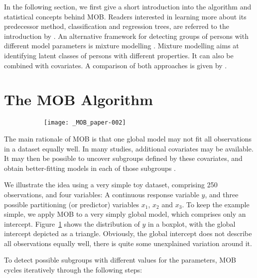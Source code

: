 \documentclass[doc,floatsintext,natbib]{apa7}
\begin{document}
In the following section, we first give a short introduction into the algorithm and statistical concepts behind MOB. Readers interested in learning more about its predecessor method, classification and regression trees, are referred to the introduction by \citet{StrMalTut:2009:PM}. An alternative framework for detecting groups of persons with different model parameters is mixture modelling \citep[see, e.g.,][in the context of Rasch modelling]{AyalySant17,FriStrZei:2015:EaPM}. Mixture modelling aims at identifying latent classes of persons with different properties. It can also be combined with covariates. A comparison of both approaches is given by \citet{FriStrZei:2014}. 


\section{The MOB Algorithm}


\begin{figure}
\caption{Univariate distribution of the response variable, with global mean indicated by triangle.}
\begin{subfigure}{.5\textwidth}
\texttt{[image: \_MOB\_paper-002]}
\end{subfigure}
\label{fig:global}
\end{figure}

The main rationale of MOB is that one global model may not fit all observations in a dataset equally well. In many studies, additional covariates may be available. It may then be possible to uncover subgroups defined by these covariates, and obtain better-fitting models in each of those subgroups \citep{ZeilyHoth08}. 

We illustrate the idea using a very simple toy dataset, comprising 250 observations, and four variables: A continuous response variable $y$, and three possible partitioning (or predictor) variables $x_1$, $x_2$ and $x_3$. To keep the example simple, we apply MOB to a very simply global model, which comprises only an intercept. Figure~\ref{fig:global} shows the distribution of $y$ in a boxplot, with the global intercept depicted as a triangle. Obviously, the global intercept does not describe all observations equally well, there is quite some unexplained variation around it.

To detect possible subgroups with different values for the parameters, MOB cycles iteratively through the following steps:
\end{document}
